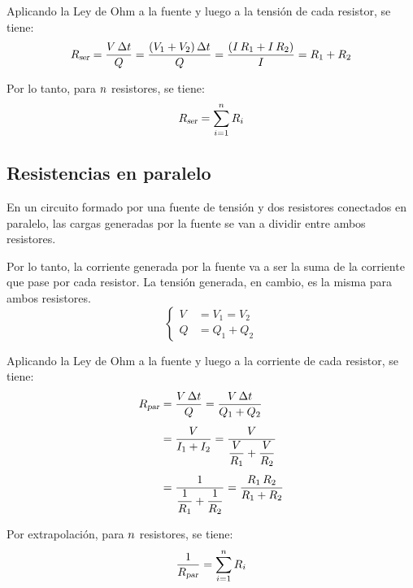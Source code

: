 \documentclass[a5paper,12pt,twoside]{book}
\begin{document}
Aplicando la Ley de Ohm a la fuente y luego a la tensión de cada resistor, se tiene:
\begin{equation*}
    {{R}_\textsl{{ser}}} = \frac{V \, \Delta t}{Q} = \frac{\left(V_1 + V_2\right) \Delta t}{Q} = \frac{\left(I \, R_1 + I \, R_2\right)}{I} = R_1 + R_2
\end{equation*}

Por lo tanto, para $n$ resistores, se tiene:
\begin{equation*}
    {{R}_\textsl{{ser}}} = \sum_{i=1}^n R_i
\end{equation*}


\subsection*{Resistencias en paralelo}

En un circuito formado por una fuente de tensión y dos resistores conectados en paralelo, las cargas generadas por la fuente se van a dividir entre ambos resistores.

\begin{center}
    \def\svgwidth{0.5\linewidth}
    
\end{center}

Por lo tanto, la corriente generada por la fuente va a ser la suma de la corriente que pase por cada resistor. La tensión generada, en cambio, es la misma para ambos resistores.
\begin{equation*}
    \left\{
    \begin{aligned}
        V &= V_1 = V_2
        \\
        Q &= Q_1 + Q_2
    \end{aligned}
    \right.
\end{equation*}

Aplicando la Ley de Ohm a la fuente y luego a la corriente de cada resistor, se tiene:
\begin{align*}
    {{R}_\textsl{{par}}} &= \frac{V \, \Delta t}{Q} = \frac{V \, \Delta t}{Q_1 + Q_2}
    \\[1ex]
    &= \frac{V}{I_1 + I_2} = \frac{V}{\dfrac{V}{R_1} + \dfrac{V}{R_2}}
    \\[1ex]
    &= \frac{1}{\dfrac{1}{R_1}+\dfrac{1}{R_2}} = \frac{R_1 \, R_2}{R_1 + R_2}
\end{align*}

Por extrapolación, para $n$ resistores, se tiene:
\begin{equation}
    \frac{1}{{{R}_\textsl{{par}}}} = \sum_{i=1}^n R_i
\end{equation}
\end{document}
